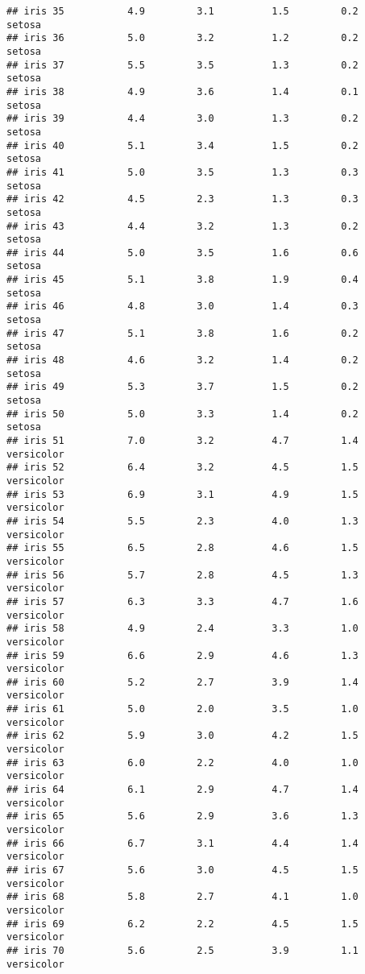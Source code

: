 \documentclass[
]{article}
\begin{document}
\begin{verbatim}
## iris 35           4.9         3.1          1.5         0.2     setosa
## iris 36           5.0         3.2          1.2         0.2     setosa
## iris 37           5.5         3.5          1.3         0.2     setosa
## iris 38           4.9         3.6          1.4         0.1     setosa
## iris 39           4.4         3.0          1.3         0.2     setosa
## iris 40           5.1         3.4          1.5         0.2     setosa
## iris 41           5.0         3.5          1.3         0.3     setosa
## iris 42           4.5         2.3          1.3         0.3     setosa
## iris 43           4.4         3.2          1.3         0.2     setosa
## iris 44           5.0         3.5          1.6         0.6     setosa
## iris 45           5.1         3.8          1.9         0.4     setosa
## iris 46           4.8         3.0          1.4         0.3     setosa
## iris 47           5.1         3.8          1.6         0.2     setosa
## iris 48           4.6         3.2          1.4         0.2     setosa
## iris 49           5.3         3.7          1.5         0.2     setosa
## iris 50           5.0         3.3          1.4         0.2     setosa
## iris 51           7.0         3.2          4.7         1.4 versicolor
## iris 52           6.4         3.2          4.5         1.5 versicolor
## iris 53           6.9         3.1          4.9         1.5 versicolor
## iris 54           5.5         2.3          4.0         1.3 versicolor
## iris 55           6.5         2.8          4.6         1.5 versicolor
## iris 56           5.7         2.8          4.5         1.3 versicolor
## iris 57           6.3         3.3          4.7         1.6 versicolor
## iris 58           4.9         2.4          3.3         1.0 versicolor
## iris 59           6.6         2.9          4.6         1.3 versicolor
## iris 60           5.2         2.7          3.9         1.4 versicolor
## iris 61           5.0         2.0          3.5         1.0 versicolor
## iris 62           5.9         3.0          4.2         1.5 versicolor
## iris 63           6.0         2.2          4.0         1.0 versicolor
## iris 64           6.1         2.9          4.7         1.4 versicolor
## iris 65           5.6         2.9          3.6         1.3 versicolor
## iris 66           6.7         3.1          4.4         1.4 versicolor
## iris 67           5.6         3.0          4.5         1.5 versicolor
## iris 68           5.8         2.7          4.1         1.0 versicolor
## iris 69           6.2         2.2          4.5         1.5 versicolor
## iris 70           5.6         2.5          3.9         1.1 versicolor

\end{verbatim}
\end{document}
